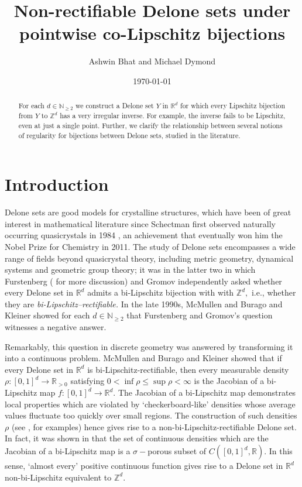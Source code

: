 \documentclass{article}
\title{Non-rectifiable Delone sets under pointwise co-Lipschitz bijections}
\author{Ashwin Bhat and Michael Dymond}
\date{\today}
\newcommand{\R}{\mathbb{R}}
\newcommand{\Z}{\mathbb{Z}}
\newcommand{\N}{\mathbb{N}}
\begin{document}
\maketitle
\begin{abstract}
    For each $d\in\N_{\geq 2}$ we construct a Delone set $Y$ in $\R^{d}$ for which every Lipschitz bijection from $Y$ to $\Z^{d}$ has a very irregular inverse. For example, the inverse fails to be Lipschitz, even at just a single point. Further, we clarify the relationship between several notions of regularity for bijections between Delone sets, studied in the literature.
\end{abstract}

\section{Introduction}
Delone sets are good models for crystalline structures, which have been of great interest in mathematical literature since Schectman first observed naturally occurring quasicrystals in 1984 \cite{schechtman1}, an achievement that eventually won him the Nobel Prize for Chemistry in 2011.
The study of Delone sets encompasses a wide range of fields beyond quasicrystal theory, including metric geometry, dynamical systems and geometric group theory; it was in the latter two in which Furstenberg (\cite{burago2002rectifying} for more discussion) and Gromov \cite{gromov1992asymptotic} independently asked whether every Delone set in $\R^d$ admits a bi-Lipschitz bijection with with $\Z^d,$ i.e., whether they are \emph{bi-Lipschitz--rectifiable.}  In the late 1990s, McMullen \cite{mcmullen1998lipschitz} and Burago and Kleiner \cite{burago1998separated} showed for each $d \in \N_{\geq 2}$ that Furstenberg and Gromov's question witnesses a negative answer.

Remarkably, this question in discrete geometry was answered by transforming it into a continuous problem. McMullen \cite{mcmullen1998lipschitz} and Burago and Kleiner \cite{burago1998separated} showed that if every Delone set in $\R^d$ is bi-Lipschitz-rectifiable, then every measurable density $\rho:[0,1]^d \to \R_{>0}$ satisfying $0<\inf\rho \leq \sup \rho <\infty$ is the Jacobian of a bi-Lipschitz map $f:[0,1]^d \to \R^d.$ The Jacobian of a bi-Lipschitz map demonstrates local properties which are violated by `checkerboard-like' densities whose average values fluctuate too quickly over small regions. The construction of such densities $\rho$ (see \cite[Chapter $3$]{mcmullen1998lipschitz}, \cite[Lemma $2.1$]{burago1998separated} for examples) hence gives rise to a non-bi-Lipschitz-rectifiable Delone set. In fact, it was shown in \cite{dymond2018mapping} that the set of continuous densities which are the Jacobian of a bi-Lipschitz map is a $\sigma-$porous subset of $C([0,1]^d, \R).$ In this sense, `almost every' positive continuous function gives rise to a Delone set in $\R^d$ non-bi-Lipschitz equivalent to $\Z^d.$
\end{document}
